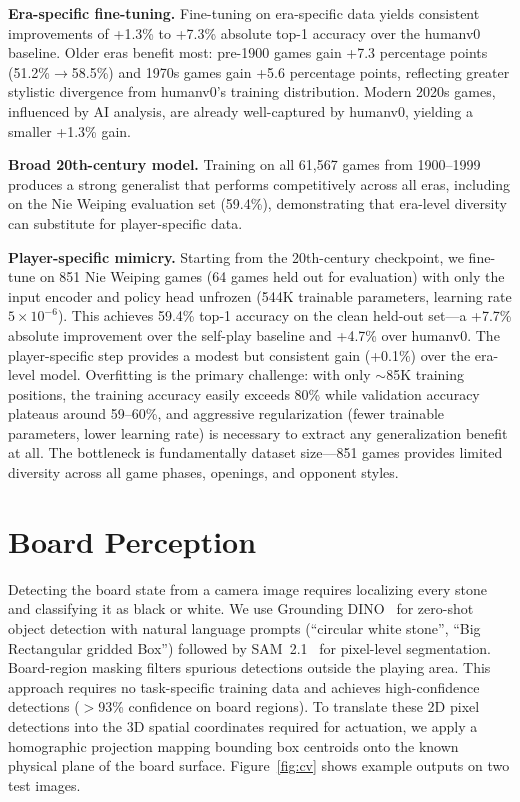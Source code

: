 \documentclass{article}
\begin{document}
\textbf{Era-specific fine-tuning.} Fine-tuning on era-specific data yields consistent improvements of +1.3\% to +7.3\% absolute top-1 accuracy over the humanv0 baseline. Older eras benefit most: pre-1900 games gain +7.3 percentage points (51.2\%$\to$58.5\%) and 1970s games gain +5.6 percentage points, reflecting greater stylistic divergence from humanv0's training distribution. Modern 2020s games, influenced by AI analysis, are already well-captured by humanv0, yielding a smaller +1.3\% gain.

\textbf{Broad 20th-century model.} Training on all 61,567 games from 1900--1999 produces a strong generalist that performs competitively across all eras, including on the Nie Weiping evaluation set (59.4\%), demonstrating that era-level diversity can substitute for player-specific data.

\textbf{Player-specific mimicry.} Starting from the 20th-century checkpoint, we fine-tune on 851 Nie Weiping games (64 games held out for evaluation) with only the input encoder and policy head unfrozen (544K trainable parameters, learning rate $5{\times}10^{-6}$). This achieves 59.4\% top-1 accuracy on the clean held-out set---a +7.7\% absolute improvement over the self-play baseline and +4.7\% over humanv0. The player-specific step provides a modest but consistent gain (+0.1\%) over the era-level model. Overfitting is the primary challenge: with only ${\sim}$85K training positions, the training accuracy easily exceeds 80\% while validation accuracy plateaus around 59--60\%, and aggressive regularization (fewer trainable parameters, lower learning rate) is necessary to extract any generalization benefit at all. The bottleneck is fundamentally dataset size---851 games provides limited diversity across all game phases, openings, and opponent styles.

\section{Board Perception}
\label{sec:cv}

Detecting the board state from a camera image requires localizing every stone and classifying it as black or white. We use Grounding DINO~\cite{liu2023grounding} for zero-shot object detection with natural language prompts (``circular white stone'', ``Big Rectangular gridded Box'') followed by SAM~2.1~\cite{ravi2024sam2} for pixel-level segmentation. Board-region masking filters spurious detections outside the playing area. This approach requires no task-specific training data and achieves high-confidence detections ($>$93\% confidence on board regions). To translate these 2D pixel detections into the 3D spatial coordinates required for actuation, we apply a homographic projection mapping bounding box centroids onto the known physical plane of the board surface. Figure~\ref{fig:cv} shows example outputs on two test images.
\end{document}
